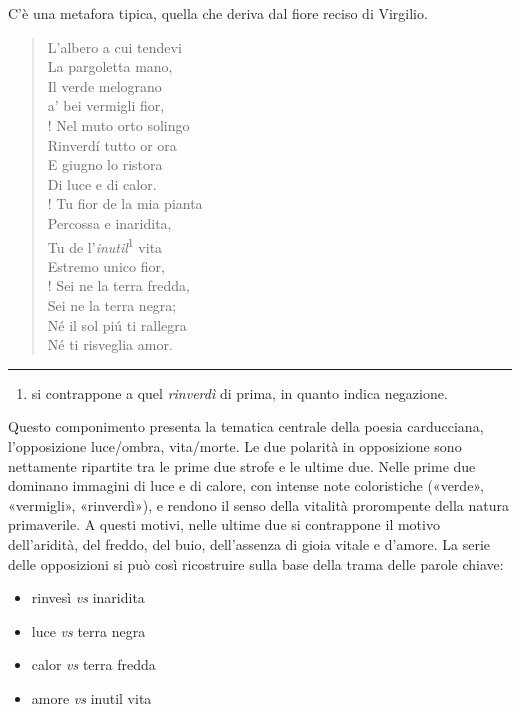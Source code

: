 \documentclass{book}
\begin{document}
C'è una metafora tipica, quella che deriva dal fiore reciso di Virgilio.

\begin{verse}
L’albero a cui tendevi\\
La pargoletta mano,\\
Il verde melograno\\
a’ bei vermigli fior,\\!
Nel muto orto solingo\\
Rinverdí tutto or ora\\
E giugno lo ristora\\
Di luce e di calor.\\!
Tu fior de la mia pianta\\
Percossa e inaridita,\\
Tu de l’\textit{inutil}\textsuperscript{1} vita\\
Estremo unico fior,\\!
Sei ne la terra fredda,\\
Sei ne la terra negra;\\
Né il sol piú ti rallegra\\
Né ti risveglia amor.
\end{verse}

\vspace*{1em}\hrule\vspace*{1em}

\begin{enumerate}
\item si contrappone a quel \emph{rinverdì}
  di prima, in quanto indica negazione.
\end{enumerate}

Questo componimento presenta la tematica centrale della poesia carducciana, l'opposizione luce/ombra, vita/morte. Le due polarità in opposizione sono nettamente ripartite tra le prime due strofe e le ultime due. Nelle prime due dominano immagini di luce e di calore, con intense note coloristiche («verde», «vermigli», «rinverdì»), e rendono il senso della vitalità prorompente della natura primaverile. A questi motivi, nelle ultime due si contrappone il motivo dell'aridità, del freddo, del buio, dell'assenza di gioia vitale e d'amore. La serie delle opposizioni si può così ricostruire sulla base della trama delle parole chiave:
\begin{itemize}
\item rinvesì \textit{vs} inaridita
\item luce \textit{vs} terra negra
\item calor \textit{vs} terra fredda
\item amore \textit{vs} inutil vita
\end{itemize}
\end{document}
